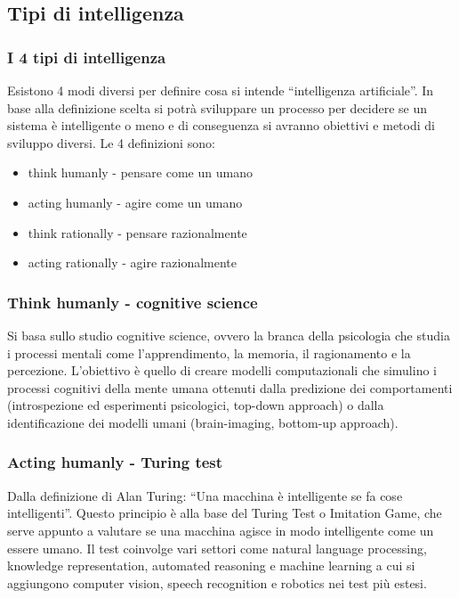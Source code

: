 \subsection{Tipi di intelligenza}
\subsubsection*{I 4 tipi di intelligenza}
Esistono 4 modi diversi per definire cosa si intende ``intelligenza artificiale''. In base alla definizione scelta si potrà
sviluppare un processo per decidere se un sistema è intelligente o meno e di conseguenza si avranno obiettivi e metodi di
sviluppo diversi. Le 4 definizioni sono:

\begin{center}
	\begin{minipage}{0.45\textwidth}
		\begin{itemize}
			\item[] think humanly - pensare come un umano
			\item[] acting humanly - agire come un umano
		\end{itemize}
	\end{minipage}
	\begin{minipage}{0.45\textwidth}
		\begin{itemize}
			\item[] think rationally - pensare razionalmente
			\item[] acting rationally - agire razionalmente
		\end{itemize}
	\end{minipage}
\end{center}

\subsubsection*{Think humanly - cognitive science}
Si basa sullo studio cognitive science, ovvero la branca della psicologia che studia i processi mentali come l'apprendimento,
la memoria, il ragionamento e la percezione. L'obiettivo è quello di creare modelli computazionali che simulino i processi
cognitivi della mente umana ottenuti dalla predizione dei comportamenti (introspezione ed esperimenti psicologici, top-down
approach) o dalla identificazione dei modelli umani (brain-imaging, bottom-up approach).

\subsubsection*{Acting humanly - Turing test}
Dalla definizione di Alan Turing: ``Una macchina è intelligente se fa cose intelligenti''. Questo principio è alla base del
Turing Test o Imitation Game, che serve appunto a valutare se una macchina agisce in modo intelligente come un essere umano.
Il test coinvolge vari settori come natural language processing, knowledge representation, automated reasoning e machine learning
a cui si aggiungono computer vision, speech recognition e robotics nei test più estesi.

